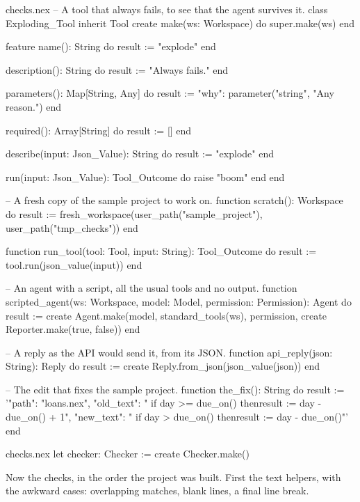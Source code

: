 \begin{continued}{checks.nex}
-- A tool that always fails, to see that the agent survives it.
class Exploding_Tool inherit Tool
create
  make(ws: Workspace) do
    super.make(ws)
  end

feature
  name(): String do
    result := "explode"
  end

  description(): String do
    result := "Always fails."
  end

  parameters(): Map[String, Any] do
    result := {"why": parameter("string", "Any reason.")}
  end

  required(): Array[String] do
    result := []
  end

  describe(input: Json_Value): String do
    result := "explode"
  end

  run(input: Json_Value): Tool_Outcome do
    raise "boom"
  end
end

-- A fresh copy of the sample project to work on.
function scratch(): Workspace do
  result := fresh_workspace(user_path("sample_project"), user_path("tmp_checks"))
end

function run_tool(tool: Tool, input: String): Tool_Outcome do
  result := tool.run(json_value(input))
end

-- An agent with a script, all the usual tools and no output.
function scripted_agent(ws: Workspace, model: Model, permission: Permission): Agent do
  result := create Agent.make(model, standard_tools(ws), permission,
    create Reporter.make(true, false))
end

-- A reply as the API would send it, from its JSON.
function api_reply(json: String): Reply do
  result := create Reply.from_json(json_value(json))
end

-- The edit that fixes the sample project.
function the_fix(): String do
  result := '{"path": "loans.nex", "old_text": "    if day >= due_on() then\n      result := day - due_on() + 1", "new_text": "    if day > due_on() then\n      result := day - due_on()"}'
end
\end{continued}

\begin{continued}{checks.nex}
let checker: Checker := create Checker.make()
\end{continued}

Now the checks, in the order the project was built. First the text
helpers, with the awkward cases: overlapping matches, blank lines, a final
line break.

